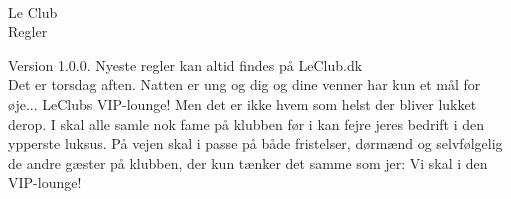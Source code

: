 \documentclass[6pt]{article}
\newcommand{\LeClub}{{\fontsize{10pt}{10pt}Le\hspace{2pt}Club}}
\begin{document}
\ 
\newpage
{}

\begin{center}
\setmainfont{DiscotequeSt}
 {\fontsize{40}{40}\selectfont Le Club\\ \fontsize{25}{25}\selectfont \vspace{0.5cm} Regler}
\end{center}

Version 1.0.0. Nyeste regler kan altid findes på LeClub.dk\\

Det er torsdag aften. Natten er ung og dig og dine venner har kun et mål for øje... \LeClub s VIP-lounge! Men det er ikke hvem som helst der bliver lukket derop. I skal alle samle nok fame på klubben før i kan fejre jeres bedrift i den ypperste luksus. På vejen skal i passe på både fristelser, dørmænd og selvfølgelig de andre gæster på klubben, der kun tænker det samme som jer: Vi skal i den VIP-lounge!


\newpage
{}

\newpage
{}
\ThisTileWallPaper{\paperwidth}{\paperheight}{rulebook_page.png}







\newpage
{}
\ 
\end{document}
